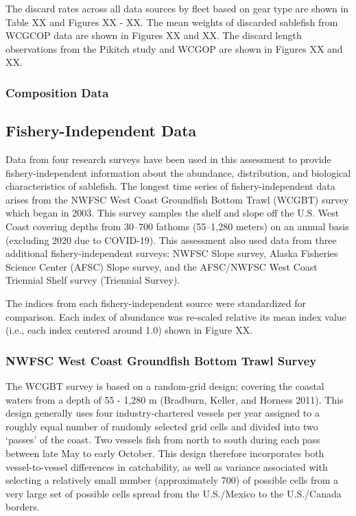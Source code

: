 \documentclass[
]{scrartcl}
\begin{document}
The discard rates across all data sources by fleet based on gear type
are shown in Table XX and Figures XX - XX. The mean weights of discarded
sablefish from WCGCOP data are shown in Figures XX and XX. The discard
length observations from the Pikitch study and WCGOP are shown in
Figures XX and XX.

\subsubsection{Composition Data}\label{composition-data}

\subsection{Fishery-Independent Data}\label{fishery-independent-data}

Data from four research surveys have been used in this assessment to
provide fishery-independent information about the abundance,
distribution, and biological characteristics of sablefish. The longest
time series of fishery-independent data arises from the NWFSC West Coast
Groundfish Bottom Trawl (WCGBT) survey which began in 2003. This survey
samples the shelf and slope off the U.S. West Coast covering depths from
30--700 fathoms (55--1,280 meters) on an annual basis (excluding 2020
due to COVID-19). This assessment also used data from three additional
fishery-independent surveys: NWFSC Slope survey, Alaska Fisheries
Science Center (AFSC) Slope survey, and the AFSC/NWFSC West Coast
Triennial Shelf survey (Triennial Survey).

The indices from each fishery-independent source were standardized for
comparison. Each index of abundance was re-scaled relative its mean
index value (i.e., each index centered around 1.0) shown in Figure XX.

\subsubsection{NWFSC West Coast Groundfish Bottom Trawl
Survey}\label{nwfsc-west-coast-groundfish-bottom-trawl-survey}

The WCGBT survey is based on a random-grid design; covering the coastal
waters from a depth of 55 - 1,280 m (Bradburn, Keller, and Horness
2011). This design generally uses four industry-chartered vessels per
year assigned to a roughly equal number of randomly selected grid cells
and divided into two `passes' of the coast. Two vessels fish from north
to south during each pass between late May to early October. This design
therefore incorporates both vessel-to-vessel differences in
catchability, as well as variance associated with selecting a relatively
small number (approximately 700) of possible cells from a very large set
of possible cells spread from the U.S./Mexico to the U.S./Canada
borders.
\end{document}

